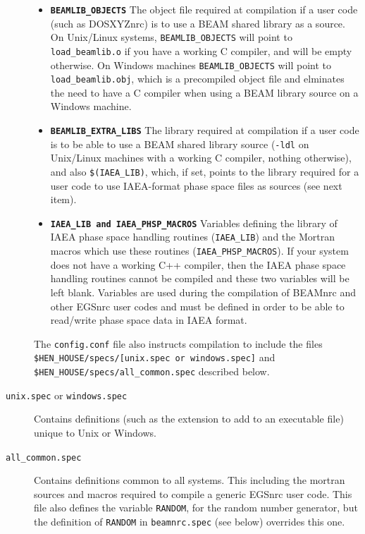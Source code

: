 \documentclass[12pt,twoside]{article}
\begin{document}
\begin{description}
\begin{itemize}
\item {\bf \tt BEAMLIB\_OBJECTS} The object
file required at compilation if a user code (such as DOSXYZnrc) is to
use a BEAM shared library as a source.  On Unix/Linux systems,
{\tt BEAMLIB\_OBJECTS} will
point to {\tt load\_beamlib.o} if you have a working C compiler, and will be
empty otherwise.  On Windows machines {\tt BEAMLIB\_OBJECTS} will
point to {\tt load\_beamlib.obj}, which is a precompiled object file and
elminates the need to have a C compiler when using a BEAM library source
on a Windows machine.
\item {\bf \tt BEAMLIB\_EXTRA\_LIBS} The library required at compilation
if a user code is to be able to use a BEAM shared library source
({\tt -ldl} on Unix/Linux machines with a working C compiler,
nothing otherwise), and also {\tt \$(IAEA\_LIB)}, which, if set, points
to the library required for a user code to use IAEA-format phase space
files as sources (see next item).
\item {\bf \tt IAEA\_LIB and IAEA\_PHSP\_MACROS}
Variables defining the library of IAEA phase space handling routines
({\tt IAEA\_LIB}) and the Mortran macros which use these routines
({\tt IAEA\_PHSP\_MACROS}). If your system does not have a working
C++ compiler, then the IAEA phase space handling routines cannot be compiled
and these two variables will be left blank.  Variables are used during the
compilation of BEAMnrc and other EGSnrc user codes and must be defined in
order to be able to read/write phase space data in IAEA format.
\end{itemize}
The {\tt config.conf} file also instructs compilation to include the files\\
{\tt \$HEN\_HOUSE/specs/[unix.spec or windows.spec]} and\\
{\tt \$HEN\_HOUSE/specs/all\_common.spec} described below.
\item [{\tt unix.spec} or {\tt windows.spec}]  Contains definitions
(such as the extension to add to an executable file) unique to Unix or
Windows.
\item [{\tt all\_common.spec}] Contains definitions common to all systems.
This including the mortran sources and macros required to compile a
generic EGSnrc user code.  This file also defines the variable
{\tt RANDOM}, for the random number generator, but the definition
of {\tt RANDOM} in {\tt beamnrc.spec} (see below) overrides this one.

\end{description}
\end{document}
